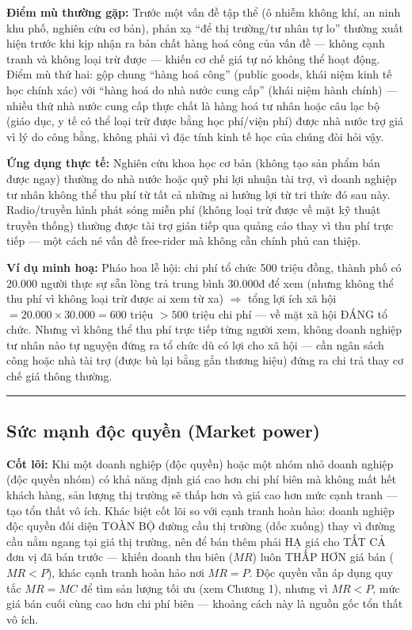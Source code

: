 \documentclass[
]{article}
\begin{document}
\textbf{Điểm mù thường gặp:} Trước một vấn đề tập thể (ô nhiễm không
khí, an ninh khu phố, nghiên cứu cơ bản), phản xạ ``để thị trường/tư
nhân tự lo'' thường xuất hiện trước khi kịp nhận ra bản chất hàng hoá
công của vấn đề --- không cạnh tranh và không loại trừ được --- khiến cơ
chế giá tự nó không thể hoạt động. Điểm mù thứ hai: gộp chung ``hàng hoá
công'' (public goods, khái niệm kinh tế học chính xác) với ``hàng hoá do
nhà nước cung cấp'' (khái niệm hành chính) --- nhiều thứ nhà nước cung
cấp thực chất là hàng hoá tư nhân hoặc câu lạc bộ (giáo dục, y tế có thể
loại trừ được bằng học phí/viện phí) được nhà nước trợ giá vì lý do công
bằng, không phải vì đặc tính kinh tế học của chúng đòi hỏi vậy.

\textbf{Ứng dụng thực tế:} Nghiên cứu khoa học cơ bản (không tạo sản
phẩm bán được ngay) thường do nhà nước hoặc quỹ phi lợi nhuận tài trợ,
vì doanh nghiệp tư nhân không thể thu phí từ tất cả những ai hưởng lợi
từ tri thức đó sau này. Radio/truyền hình phát sóng miễn phí (không loại
trừ được về mặt kỹ thuật truyền thống) thường được tài trợ gián tiếp qua
quảng cáo thay vì thu phí trực tiếp --- một cách né vấn đề free-rider mà
không cần chính phủ can thiệp.

\textbf{Ví dụ minh hoạ:} Pháo hoa lễ hội: chi phí tổ chức 500 triệu
đồng, thành phố có 20.000 người thực sự sẵn lòng trả trung bình 30.000đ
để xem (nhưng không thể thu phí vì không loại trừ được ai xem từ xa)
\(\Rightarrow\) tổng lợi ích xã hội \(= 20.000 \times 30.000 = 600\)
triệu \(> 500\) triệu chi phí --- về mặt xã hội ĐÁNG tổ chức. Nhưng vì
không thể thu phí trực tiếp từng người xem, không doanh nghiệp tư nhân
nào tự nguyện đứng ra tổ chức dù có lợi cho xã hội --- cần ngân sách
công hoặc nhà tài trợ (được bù lại bằng gắn thương hiệu) đứng ra chi trả
thay cơ chế giá thông thường.

\begin{center}\rule{0.5\linewidth}{0.5pt}\end{center}

\subsection{Sức mạnh độc quyền (Market
power)}\label{sux1ee9c-mux1ea1nh-ux111ux1ed9c-quyux1ec1n-market-power}

\textbf{Cốt lõi:} Khi một doanh nghiệp (độc quyền) hoặc một nhóm nhỏ
doanh nghiệp (độc quyền nhóm) có khả năng định giá cao hơn chi phí biên
mà không mất hết khách hàng, sản lượng thị trường sẽ thấp hơn và giá cao
hơn mức cạnh tranh --- tạo tổn thất vô ích. Khác biệt cốt lõi so với
cạnh tranh hoàn hảo: doanh nghiệp độc quyền đối diện TOÀN BỘ đường cầu
thị trường (dốc xuống) thay vì đường cầu nằm ngang tại giá thị trường,
nên để bán thêm phải HẠ giá cho TẤT CẢ đơn vị đã bán trước --- khiến
doanh thu biên (\(MR\)) luôn THẤP HƠN giá bán (\(MR < P\)), khác cạnh
tranh hoàn hảo nơi \(MR = P\). Độc quyền vẫn áp dụng quy tắc \(MR = MC\)
để tìm sản lượng tối ưu (xem Chương 1), nhưng vì \(MR < P\), mức giá bán
cuối cùng cao hơn chi phí biên --- khoảng cách này là nguồn gốc tổn thất
vô ích.
\end{document}
